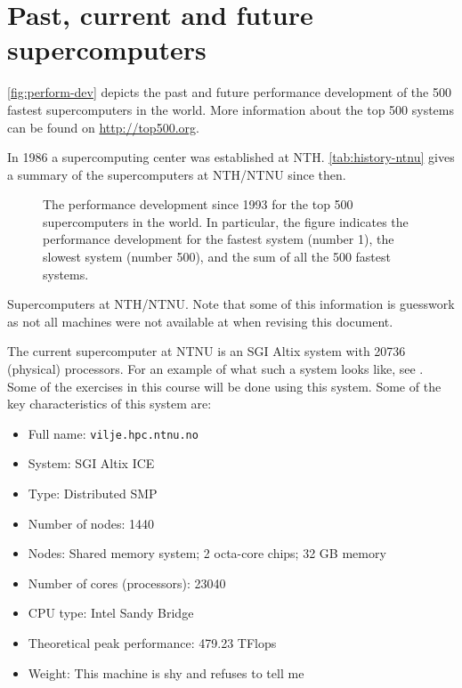 \section{Past, current and future supercomputers}

\autoref{fig:perform-dev} depicts the past and future performance development
of the 500 fastest supercomputers in the world. More information about the top
500 systems can be found on \url{http://top500.org}.

In 1986 a supercomputing center was established at NTH.
\autoref{tab:history-ntnu} gives a summary of the supercomputers at NTH/NTNU
since then.

\begin{figure}
  \centering
  
  \caption{
    The performance development since 1993 for the top 500 supercomputers in the
    world. In particular, the figure indicates the performance development for
    the fastest system (number 1), the slowest system (number 500), and the sum
    of all the 500 fastest systems.
  }
  \label{fig:perform-dev}
\end{figure}

\begin{table}
  \caption{
    Supercomputers at NTH/NTNU. Note that some of this information is guesswork
    as not all machines were not available at when revising this document.
  }
  \centering
  
  \label{tab:history-ntnu}
\end{table}

The current supercomputer at NTNU is an SGI Altix system with 20736 (physical)
processors. For an example of what such a system looks like, see
. Some of the exercises in this course will be done using
this system. Some of the key characteristics of this system are:
\begin{itemize}
\item Full name: \texttt{vilje.hpc.ntnu.no}
\item System: SGI Altix ICE
\item Type: Distributed SMP
\item Number of nodes: 1440
\item Nodes: Shared memory system; 2 octa-core chips; 32 GB memory
\item Number of cores (processors): 23040
\item CPU type: Intel Sandy Bridge
\item Theoretical peak performance: 479.23 TFlops
\item Weight: This machine is shy and refuses to tell me
\end{itemize}

